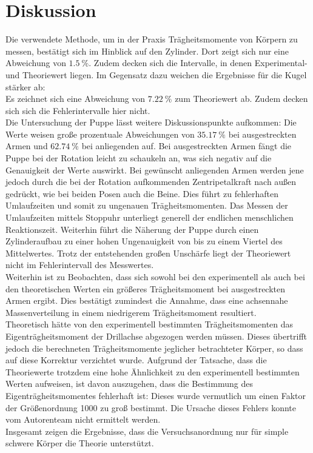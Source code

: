 \section{Diskussion}
\label{sec:Diskussion}
Die verwendete Methode, um in der Praxis Trägheitsmomente von Körpern zu messen, bestätigt sich im Hinblick auf den Zylinder.
Dort zeigt sich nur eine Abweichung von $\SI{1.5}{\percent}$.
Zudem decken sich die Intervalle, in denen Experimental- und Theoriewert liegen.
Im Gegensatz dazu weichen die Ergebnisse für die Kugel stärker ab:\\
Es zeichnet sich eine Abweichung von $\SI{7.22}{\percent}$ zum Theoriewert ab.
Zudem decken sich sich die Fehlerintervalle hier nicht.\\
Die Untersuchung der Puppe lässt weitere Diskussionspunkte aufkommen:
Die Werte weisen große prozentuale Abweichungen von $\SI{35.17}{\percent}$ bei ausgestreckten Armen und $\SI{62.74}{\percent}$ bei anliegenden auf.
Bei ausgestreckten Armen fängt die Puppe bei der Rotation leicht zu schaukeln an, was sich negativ auf die Genauigkeit der Werte auswirkt.
Bei gewünscht anliegenden Armen werden jene jedoch durch die bei der Rotation aufkommenden Zentripetalkraft nach außen gedrückt, wie bei beiden Posen auch die Beine.
Dies führt zu fehlerhaften Umlaufzeiten und somit zu ungenauen Trägheitsmomenten.
Das Messen der Umlaufzeiten mittels Stoppuhr unterliegt generell der endlichen menschlichen Reaktionszeit.
Weiterhin führt die Näherung der Puppe durch einen Zylinderaufbau zu einer hohen Ungenauigkeit von bis zu einem Viertel des Mittelwertes. Trotz der entstehenden großen Unschärfe liegt der Theoriewert nicht im Fehlerintervall des Messwertes. \\
Weiterhin ist zu Beobachten, dass sich sowohl bei den experimentell als auch bei den theoretischen Werten ein größeres Trägheitsmoment bei ausgestreckten Armen ergibt.
Dies bestätigt zumindest die Annahme, dass eine achsennahe Massenverteilung in einem niedrigerem Trägheitsmoment resultiert.\\
Theoretisch hätte von den experimentell bestimmten Trägheitsmomenten das Eigenträgheitsmoment der Drillachse abgezogen werden müssen.
Dieses übertrifft jedoch die berechneten Trägheitsmomente jeglicher betrachteter Körper, so dass auf diese Korrektur verzichtet wurde.
Aufgrund der Tatsache, dass die Theoriewerte trotzdem eine hohe Ähnlichkeit zu den experimentell bestimmten Werten aufweisen, ist davon auszugehen, dass die Bestimmung des Eigenträgheitsmomentes fehlerhaft ist:
Dieses wurde vermutlich um einen Faktor der Größenordnung 1000 zu groß bestimmt.
Die Ursache dieses Fehlers konnte vom Autorenteam nicht ermittelt werden.\\
Insgesamt zeigen die Ergebnisse, dass die Versuchsanordnung nur für simple schwere Körper die Theorie unterstützt.

